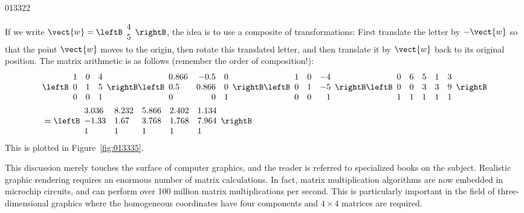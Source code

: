 \begin{example}{}{013322}
\begin{solution}
If we write $\vect{w} = \leftB
\begin{array}{c}
4\\
5
\end{array}
\rightB$, the idea is to use a composite of transformations: First translate the letter by $-\vect{w}$ so that the point $\vect{w}$ moves to the origin, then rotate this translated letter, and then translate it by $\vect{w}$ back to its original position. The matrix arithmetic is as follows (remember the order of composition!):
\begin{align*}
& \leftB
\begin{array}{rrr}
1 & 0 & 4\\
0 & 1 & 5\\
0 & 0 & 1
\end{array}
\rightB
\leftB
\begin{array}{lrr}
0.866 & -0.5 & 0\\
0.5 & 0.866 & 0\\
0 & 0 & 1
\end{array}
\rightB
\leftB
\begin{array}{rrr}
1 & 0 & -4\\
0 & 1 & -5\\
0 & 0 & 1
\end{array}
\rightB
\leftB
\begin{array}{rrrrr}
0 & 6 & 5 & 1 & 3\\
0 & 0 & 3 & 3 & 9 \\
1 & 1 & 1 & 1 & 1
\end{array}
\rightB \\
&= \leftB
\begin{array}{lllll}
3.036 & 8.232 & 5.866 & 2.402 & 1.134\\
-1.33 & 1.67 & 3.768 & 1.768 & 7.964 \\
1 & 1 & 1 & 1 & 1
\end{array}
\rightB
\end{align*}
This is plotted in Figure~\ref{fig:013335}.

\end{solution}
\end{example}

This discussion merely touches the  surface of computer graphics, and the reader is referred to specialized  books on the subject. Realistic graphic rendering requires an enormous  number of matrix calculations. In fact, matrix multiplication algorithms  are now embedded in microchip circuits, and can perform over 100  million matrix multiplications per second. This is particularly  important in the field of three-dimensional graphics where the  homogeneous coordinates have four components and $4 \times 4$ matrices are  required.

